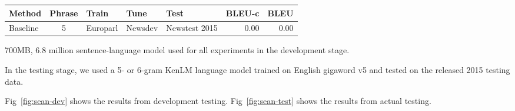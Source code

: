 \begin{figure*}
    \begin{center}
        \begin{tabular}{lclllrr}
            \hline
            \textbf{Method} & \textbf{Phrase} & \textbf{Train} & \textbf{Tune} &
            \textbf{Test} & \textbf{BLEU-c} & \textbf{BLEU} \\
            \hline
            Baseline & 5 & Europarl & Newsdev & Newstest 2015 &
            0.00 & 0.00 \\
            \hline
        \end{tabular}
    \caption{Results from the testing stage with Newstest2015 testing data.}
    \label{fig:sean-test}
    \end{center}
\end{figure*}

700MB, 6.8 million sentence-language model used for all experiments in the
development stage.

In the testing stage, we used a 5- or 6-gram KenLM language model trained on
English gigaword v5 and tested on the released 2015 testing data.

Fig~\ref{fig:sean-dev} shows the results from development testing.
Fig~\ref{fig:sean-test} shows the results from actual testing.
